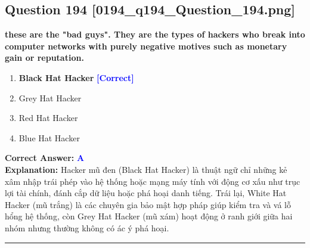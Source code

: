 \documentclass[11pt,a4paper]{article}
\begin{document}
\begin{minipage}{\textwidth}
\subsection*{Question 194 \quad \footnotesize{[0194\_q194\_Question\_194.png]}}
\noindent \textbf{these are the "bad guys". They are the types of hackers who break into computer networks with purely negative motives such as monetary gain or reputation.}

\begin{enumerate}[label=\Alph*.]
    \item \textbf{Black Hat Hacker} \hfill \textcolor{blue}{\textbf{[Correct]}}
    \item Grey Hat Hacker
    \item Red Hat Hacker
    \item Blue Hat Hacker
\end{enumerate}

\noindent \textbf{Correct Answer:} \textcolor{blue}{\textbf{A}} \\[2pt]
\noindent \textbf{Explanation:} Hacker mũ đen (Black Hat Hacker) là thuật ngữ chỉ những kẻ xâm nhập trái phép vào hệ thống hoặc mạng máy tính với động cơ xấu như trục lợi tài chính, đánh cắp dữ liệu hoặc phá hoại danh tiếng. Trái lại, White Hat Hacker (mũ trắng) là các chuyên gia bảo mật hợp pháp giúp kiểm tra và vá lỗ hổng hệ thống, còn Grey Hat Hacker (mũ xám) hoạt động ở ranh giới giữa hai nhóm nhưng thường không có ác ý phá hoại.

\par\vspace{0.3cm}
\hrule
\vspace{0.3cm}
\end{minipage}
\end{document}
